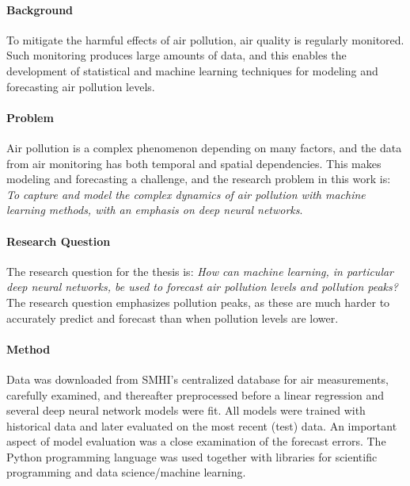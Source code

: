 \thispagestyle{empty}

\paragraph{Background}
To mitigate the harmful effects of air pollution, air quality is regularly monitored. Such monitoring produces large amounts of data, and this enables the development of statistical and machine learning techniques for modeling and forecasting air pollution levels.
\paragraph{Problem}
Air pollution is a complex phenomenon depending on many factors, and the data from air monitoring has both temporal and spatial dependencies. This makes modeling and forecasting a challenge, and the research problem in this work is: \textit{To capture and model the complex dynamics of air pollution with machine learning methods, with an emphasis on deep neural networks}.

\paragraph{Research Question}
The research question for the thesis is: \textit{How can machine learning, in particular deep neural networks, be used to forecast air pollution levels and pollution peaks?} The research question emphasizes pollution peaks, as these are much harder to accurately predict and forecast than when pollution levels are lower.  %
%

\paragraph{Method}
Data was downloaded from SMHI's centralized database for air measurements, carefully examined, and thereafter preprocessed before a linear regression and several deep neural network models were fit. All models were trained with historical data and later evaluated on the most recent (test) data. An important aspect of model evaluation was a close examination of the forecast errors. The Python programming language was used together with libraries for scientific programming and data science/machine learning.

